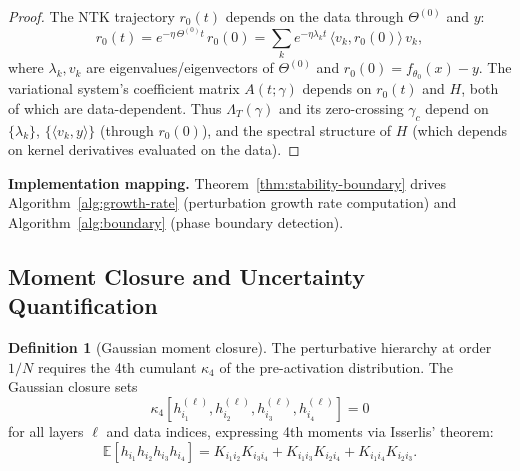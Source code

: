\documentclass[11pt]{article}
\theoremstyle{definition}
\newtheorem{definition}[theorem]{Definition}
\newcommand{\E}{\mathbb{E}}
\newcommand{\ip}[2]{\langle #1, #2 \rangle}
\renewcommand{\Theta}{\varTheta}
\begin{document}
\begin{proof}
The NTK trajectory $r_0(t)$ depends on the data through $\Theta^{(0)}$ and $y$:
\begin{equation}
r_0(t) = e^{-\eta\,\Theta^{(0)}t}\, r_0(0) = \sum_k e^{-\eta\lambda_k t}\, \ip{v_k}{r_0(0)}\, v_k,
\end{equation}
where $\lambda_k, v_k$ are eigenvalues/eigenvectors of $\Theta^{(0)}$ and $r_0(0) = f_{\theta_0}(x) - y$. The variational system's coefficient matrix $A(t;\gamma)$ depends on $r_0(t)$ and $H$, both of which are data-dependent. Thus $\Lambda_T(\gamma)$ and its zero-crossing $\gamma_c$ depend on $\{\lambda_k\}$, $\{\ip{v_k}{y}\}$ (through $r_0(0)$), and the spectral structure of $H$ (which depends on kernel derivatives evaluated on the data).
\end{proof}

\textbf{Implementation mapping.} Theorem~\ref{thm:stability-boundary} drives Algorithm~\ref{alg:growth-rate} (perturbation growth rate computation) and Algorithm~\ref{alg:boundary} (phase boundary detection).

\subsection{Moment Closure and Uncertainty Quantification}
\label{sec:moment-closure}

\begin{definition}[Gaussian moment closure]
\label{def:moment-closure}
The perturbative hierarchy at order $1/N$ requires the 4th cumulant $\kappa_4$ of the pre-activation distribution. The Gaussian closure sets
\begin{equation}
\kappa_4[h^{(\ell)}_{i_1}, h^{(\ell)}_{i_2}, h^{(\ell)}_{i_3}, h^{(\ell)}_{i_4}] = 0
\end{equation}
for all layers $\ell$ and data indices, expressing 4th moments via Isserlis' theorem:
\begin{equation}
\E[h_{i_1}h_{i_2}h_{i_3}h_{i_4}] = K_{i_1i_2}K_{i_3i_4} + K_{i_1i_3}K_{i_2i_4} + K_{i_1i_4}K_{i_2i_3}.
\end{equation}
\end{definition}
\end{document}
